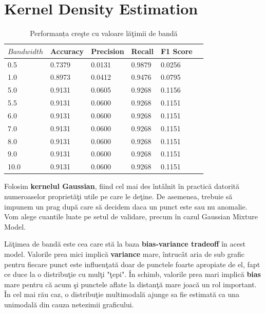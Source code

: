 \noindent
  

\section{Kernel Density Estimation}

\begin{table}[H]
  \centering
  \begin{tabularx}{\textwidth}{
      |X
      |X
      |X
      |X
      |X
      |X|
  }
  \hline
  $Bandwidth$ & {Accuracy} & {Precision} & {Recall} & {F1 Score} \\
  \hline
  \rowcolor{gray!20} 0.5 & 0.7379 & 0.0131 & 0.9879 & 0.0256 \\
  1.0 & 0.8973 & 0.0412 & 0.9476 & 0.0795 \\
  \rowcolor{gray!20} 5.0 & 0.9131 & 0.0605 & 0.9268 & 0.1156 \\
  5.5 & 0.9131 & 0.0600 & 0.9268 & 0.1151 \\
  \rowcolor{gray!20} 6.0 & 0.9131 & 0.0600 & 0.9268 & 0.1151 \\
  7.0 & 0.9131 & 0.0600 & 0.9268 & 0.1151 \\
  \rowcolor{gray!20} 8.0 & 0.9131 & 0.0600 & 0.9268 & 0.1151 \\
  9.0 & 0.9131 & 0.0600 & 0.9268 & 0.1151 \\
  \rowcolor{gray!20} 10.0 & 0.9131 & 0.0600 & 0.9268 & 0.1151 \\
  \hline
  \end{tabularx}
  \caption{Performanța creşte cu valoare lăţimii de bandă}
\end{table}

Folosim \textbf{kernelul Gaussian}, fiind cel mai des întâlnit în practică
datorită numeroaselor proprietăţi utile pe care le deţine. De asemenea, trebuie 
să impunem un prag după care să decidem daca un punct este sau nu anomalie. 
Vom alege cuantile luate pe setul de validare, precum în cazul 
Gaussian Mixture Model.

Lăţimea de bandă este cea care stă la baza \textbf{bias-variance tradeoff} 
în acest model.
Valorile prea mici implică \textbf{variance} mare, întrucât aria de sub grafic 
pentru fiecare punct este influenţată doar de punctele foarte apropiate de el, 
fapt ce duce la o distribuţie cu mulţi "ţepi". 
În schimb, valorile prea mari implică \textbf{bias} mare pentru că acum şi punctele 
aflate la distanţă mare joacă un rol important. În cel mai rău caz, o distribuţie 
multimodală ajunge sa fie estimată ca una unimodală din cauza netezimii graficului.


